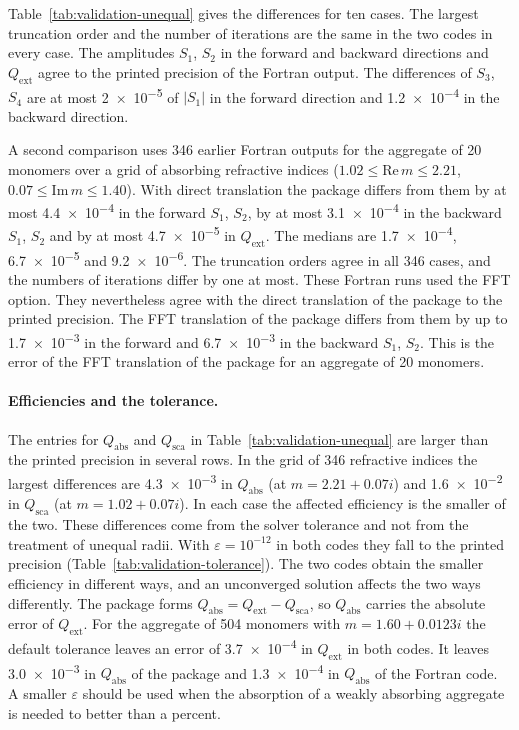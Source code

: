 \documentclass[11pt,a4paper]{article}
\begin{document}
Table~\ref{tab:validation-unequal} gives the differences for ten cases.
The largest truncation order and the number of iterations are the same in the two codes in every case.
The amplitudes $S_1$, $S_2$ in the forward and backward directions and $Q_\mathrm{ext}$ agree to the printed precision of the Fortran output.
The differences of $S_3$, $S_4$ are at most \num{2e-5} of $|S_1|$ in the forward direction and \num{1.2e-4} in the backward direction.

A second comparison uses 346 earlier Fortran outputs for the aggregate of 20 monomers over a grid of absorbing refractive indices ($1.02 \leq \mathrm{Re}\,m \leq 2.21$, $0.07 \leq \mathrm{Im}\,m \leq 1.40$).
With direct translation the package differs from them by at most \num{4.4e-4} in the forward $S_1$, $S_2$, by at most \num{3.1e-4} in the backward $S_1$, $S_2$ and by at most \num{4.7e-5} in $Q_\mathrm{ext}$.
The medians are \num{1.7e-4}, \num{6.7e-5} and \num{9.2e-6}.
The truncation orders agree in all 346 cases, and the numbers of iterations differ by one at most.
These Fortran runs used the FFT option.
They nevertheless agree with the direct translation of the package to the printed precision.
The FFT translation of the package differs from them by up to \num{1.7e-3} in the forward and \num{6.7e-3} in the backward $S_1$, $S_2$.
This is the error of the FFT translation of the package for an aggregate of 20 monomers.

\paragraph{Efficiencies and the tolerance.}
The entries for $Q_\mathrm{abs}$ and $Q_\mathrm{sca}$ in Table~\ref{tab:validation-unequal} are larger than the printed precision in several rows.
In the grid of 346 refractive indices the largest differences are \num{4.3e-3} in $Q_\mathrm{abs}$ (at $m = 2.21 + 0.07i$) and \num{1.6e-2} in $Q_\mathrm{sca}$ (at $m = 1.02 + 0.07i$).
In each case the affected efficiency is the smaller of the two.
These differences come from the solver tolerance and not from the treatment of unequal radii.
With $\varepsilon = 10^{-12}$ in both codes they fall to the printed precision (Table~\ref{tab:validation-tolerance}).
The two codes obtain the smaller efficiency in different ways, and an unconverged solution affects the two ways differently.
The package forms $Q_\mathrm{abs} = Q_\mathrm{ext} - Q_\mathrm{sca}$, so $Q_\mathrm{abs}$ carries the absolute error of $Q_\mathrm{ext}$.
For the aggregate of 504 monomers with $m = 1.60 + 0.0123i$ the default tolerance leaves an error of \num{3.7e-4} in $Q_\mathrm{ext}$ in both codes.
It leaves \num{3.0e-3} in $Q_\mathrm{abs}$ of the package and \num{1.3e-4} in $Q_\mathrm{abs}$ of the Fortran code.
A smaller $\varepsilon$ should be used when the absorption of a weakly absorbing aggregate is needed to better than a percent.
\end{document}
